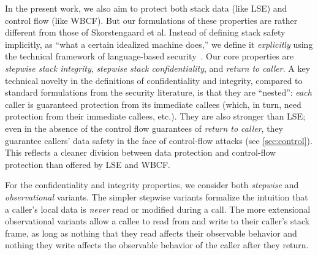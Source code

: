 \documentclass[acmsmall,review,anonymous]{acmart}\settopmatter{printfolios=true,printccs=false,printacmref=false}
\begin{document}
In the present work, we also aim to protect both stack data (like
LSE) and
control flow (like WBCF).  But our formulations of these properties are
rather different from those of Skorstengaard et al.  Instead of
defining stack safety implicitly,
as ``what a certain idealized machine does,'' we define it
\emph{explicitly} using the technical framework of language-based
security\ifaftersubmission~\citep{??}\fi.
Our core properties are \emph{stepwise stack integrity},
\emph{stepwise stack confidentiality}, and \emph{return to caller}.
%
A key technical novelty in the definitions of confidentiality and integrity,
compared to standard formulations from the security literature, is that they
are ``nested'': {\em each} caller is guaranteed protection from its
immediate callees (which, in turn, need protection from their immediate
callees, etc.). They are also stronger than LSE; even in the absence of the
control flow guarantees of {\em return to caller}, they guarantee callers'
data safety in the face of control-flow attacks (see \cref{sec:control}).
This reflects a cleaner division between data protection and control-flow protection
than offered by LSE and WBCF.

For the confidentiality and integrity properties, we consider both {\em
  stepwise} and {\em observational} variants.  The simpler {stepwise}
variants formalize the intuition that a caller's local data is {\em never}
read or modified during a call. The more extensional observational variants
allow a callee to read from and write to their caller's stack frame, as
long as nothing that they read affects their observable behavior and nothing
they write affects the observable behavior of the caller after they return.

\end{document}

